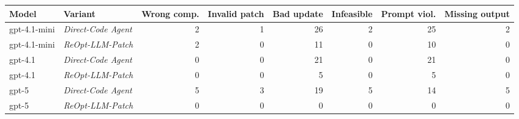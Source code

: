 \begin{tabular}{llrrrrrr}
\toprule
\textbf{Model} & \textbf{Variant} & \textbf{Wrong comp.} & \textbf{Invalid patch} & \textbf{Bad update} & \textbf{Infeasible} & \textbf{Prompt viol.} & \textbf{Missing output} \\
\midrule
gpt-4.1-mini & \emph{Direct-Code Agent} & 2 & 1 & 26 & 2 & 25 & 2 \\
gpt-4.1-mini & \emph{ReOpt-LLM-Patch} & 2 & 0 & 11 & 0 & 10 & 0 \\
\addlinespace
gpt-4.1 & \emph{Direct-Code Agent} & 0 & 0 & 21 & 0 & 21 & 0 \\
gpt-4.1 & \emph{ReOpt-LLM-Patch} & 0 & 0 & 5 & 0 & 5 & 0 \\
\addlinespace
gpt-5 & \emph{Direct-Code Agent} & 5 & 3 & 19 & 5 & 14 & 5 \\
gpt-5 & \emph{ReOpt-LLM-Patch} & 0 & 0 & 0 & 0 & 0 & 0 \\
\bottomrule
\end{tabular}

